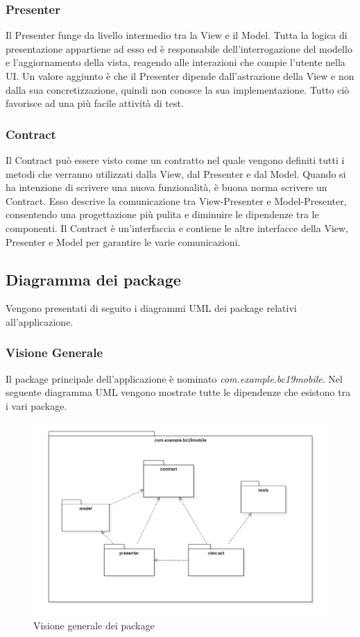 \subsubsection{Presenter}
Il Presenter funge da livello intermedio tra la View e il Model. Tutta la logica di presentazione appartiene ad esso ed è responsabile dell'interrogazione del modello e l'aggiornamento della vista, reagendo alle interazioni che compie l'utente nella UI. Un valore aggiunto è che il Presenter dipende dall'astrazione della View e non dalla sua concretizzazione, quindi non conosce la sua implementazione. Tutto ciò favorisce ad una più facile attività di test.

\subsubsection{Contract}
Il Contract può essere visto come un contratto nel quale vengono definiti tutti i metodi che verranno utilizzati dalla View, dal Presenter e dal Model. Quando si ha intenzione di scrivere una nuova funzionalità, è buona norma scrivere un Contract. Esso descrive la comunicazione tra View-Presenter e Model-Presenter, consentendo una progettazione più pulita e diminuire le dipendenze tra le componenti.
Il Contract è un'interfaccia e contiene le altre interfacce della View, Presenter e Model per garantire le varie comunicazioni.


\subsection{Diagramma dei package}
Vengono presentati di seguito i diagrammi UML dei package relativi all'applicazione.

\subsubsection{Visione Generale}
Il package principale dell'applicazione è nominato \textit{com.example.bc19mobile}.
Nel seguente diagramma UML vengono mostrate tutte le dipendenze che esistono tra i vari package.
\begin{figure}[H]
	\centering
	\includegraphics[width=16cm]{res/images/packageGeneraleApputenti.png}
	\caption{Visione generale dei package}
	\label{fig:Visione generale dei package}
\end{figure}

